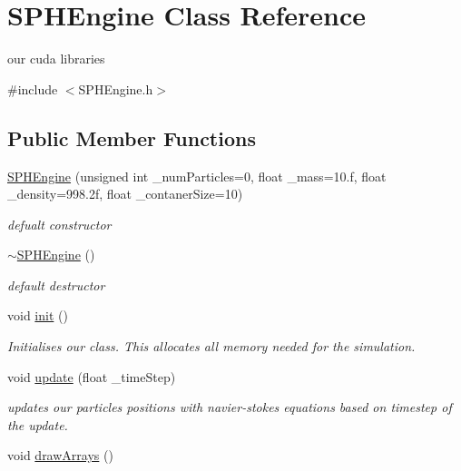 \hypertarget{class_s_p_h_engine}{\section{S\-P\-H\-Engine Class Reference}
\label{class_s_p_h_engine}
}


our cuda libraries  




{\ttfamily \#include $<$S\-P\-H\-Engine.\-h$>$}

\subsection*{Public Member Functions}
\begin{DoxyCompactItemize}
\item 
\hyperlink{class_s_p_h_engine_a8be3b3f99242c3548ade6ff9314fc46c}{S\-P\-H\-Engine} (unsigned int \-\_\-num\-Particles=0, float \-\_\-mass=10.f, float \-\_\-density=998.\-2f, float \-\_\-contaner\-Size=10)
\begin{DoxyCompactList}\small\item\em defualt constructor \end{DoxyCompactList}\item 
\hypertarget{class_s_p_h_engine_a0969407c141667c1147d409a0397257d}{\hyperlink{class_s_p_h_engine_a0969407c141667c1147d409a0397257d}{$\sim$\-S\-P\-H\-Engine} ()}\label{class_s_p_h_engine_a0969407c141667c1147d409a0397257d}

\begin{DoxyCompactList}\small\item\em default destructor \end{DoxyCompactList}\item 
\hypertarget{class_s_p_h_engine_a0df6d1b33d50afb152e2992de5af5700}{void \hyperlink{class_s_p_h_engine_a0df6d1b33d50afb152e2992de5af5700}{init} ()}\label{class_s_p_h_engine_a0df6d1b33d50afb152e2992de5af5700}

\begin{DoxyCompactList}\small\item\em Initialises our class. This allocates all memory needed for the simulation. \end{DoxyCompactList}\item 
void \hyperlink{class_s_p_h_engine_a1a17b5c04756850b68cf95b917019241}{update} (float \-\_\-time\-Step)
\begin{DoxyCompactList}\small\item\em updates our particles positions with navier-\/stokes equations based on timestep of the update. \end{DoxyCompactList}\item 
\hypertarget{class_s_p_h_engine_a91f224d67175615716059dba23c38a98}{void \hyperlink{class_s_p_h_engine_a91f224d67175615716059dba23c38a98}{draw\-Arrays} ()}\label{class_s_p_h_engine_a91f224d67175615716059dba23c38a98}


\end{DoxyCompactItemize}
